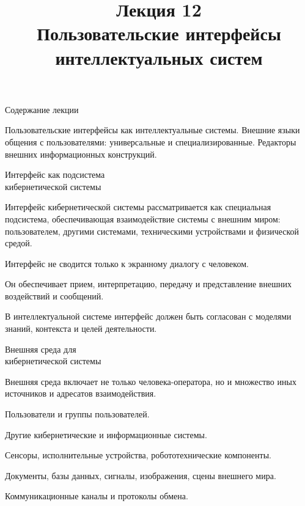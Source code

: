\title{Лекция 12\\Пользовательские интерфейсы интеллектуальных систем \vspace{-2em}}   

\begin{frame}
	\titlepage
\end{frame}

\begin{frame}{Содержание лекции}
	\topline
	\justifying

	
	Пользовательские интерфейсы как интеллектуальные системы. Внешние языки общения с пользователями: универсальные и специализированные. Редакторы внешних информационных конструкций.
	
\end{frame}

\begin{frame}{Интерфейс как подсистема\\ кибернетической системы}
	\topline
	\justifying

	Интерфейс кибернетической системы рассматривается как специальная подсистема, обеспечивающая взаимодействие системы с внешним миром: пользователем, другими системами, техническими устройствами и физической средой.
	
	\begin{textitemize}
		\item Интерфейс не сводится только к экранному диалогу с человеком.
		\item Он обеспечивает прием, интерпретацию, передачу и представление внешних воздействий и сообщений.
		\item В интеллектуальной системе интерфейс должен быть согласован с моделями знаний, контекста и целей деятельности.
	\end{textitemize}
\end{frame}

\begin{frame}{Внешняя среда для\\ кибернетической системы}
	\topline
	\justifying

	
	Внешняя среда включает не только человека-оператора, но и множество иных источников и адресатов взаимодействия.
	
	\begin{textitemize}
		\item Пользователи и группы пользователей.
		\item Другие кибернетические и информационные системы.
		\item Сенсоры, исполнительные устройства, робототехнические компоненты.
		\item Документы, базы данных, сигналы, изображения, сцены внешнего мира.
		\item Коммуникационные каналы и протоколы обмена.
	\end{textitemize}
\end{frame}

